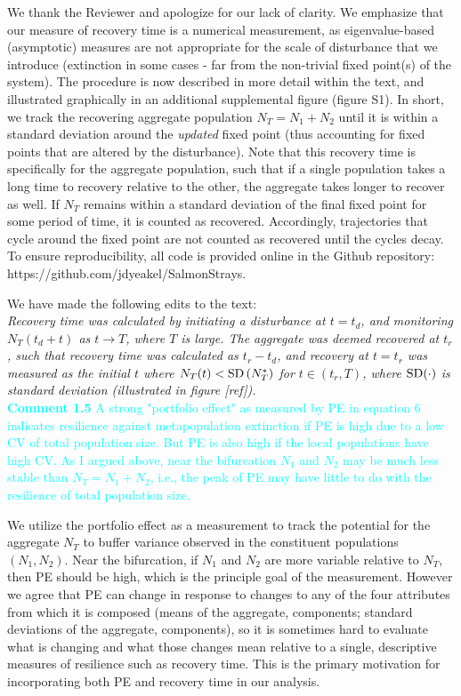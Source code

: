 \documentclass[ucm,12pt]{ucletter}
\begin{document}
\begin{letter}
 We thank the Reviewer and apologize for our lack of clarity. We emphasize that our measure of recovery time is a numerical measurement, as eigenvalue-based (asymptotic) measures are not appropriate for the scale of disturbance that we introduce (extinction in some cases - far from the non-trivial fixed point(s) of the system). The procedure is now described in more detail within the text, and illustrated graphically in an additional supplemental figure (figure S1). In short, we track the recovering aggregate population $N_T=N_1+N_2$ until it is within a standard deviation around the \emph{updated} fixed point (thus accounting for fixed points that are altered by the disturbance). Note that this recovery time is specifically for the aggregate population, such that if a single population takes a long time to recovery relative to the other, the aggregate takes longer to recover as well. If $N_T$ remains within a standard deviation of the final fixed point for some period of time, it is counted as recovered. Accordingly, trajectories that cycle around the fixed point are not counted as recovered until the cycles decay. To ensure reproducibility, all code is provided online in the Github repository: https://github.com/jdyeakel/SalmonStrays.

\noindent We have made the following edits to the text:\\
 \emph{Recovery time was calculated by initiating a disturbance at $t=t_d$, and monitoring $N_T(t_d+t)$ as $t\rightarrow T$, where $T$ is large. 
The aggregate was deemed recovered at $t_r$, such that recovery time was calculated as $t_r-t_d$, and recovery at $t=t_r$ was measured as the initial $t$ where $N_T(t) < {\rm SD}\left( N_T^* \right)$ for $t\in(t_r,T)$, where $\rm{SD}(\cdot)$ is standard deviation (illustrated in figure [ref]).}\\

\noindent \textcolor{cyan}{
{\bf Comment 1.5} A strong "portfolio effect" as measured by PE in equation 6 indicates resilience against metapopulation extinction if PE is high due to a low CV of total population size. But PE is also high if the local populations have high CV. As I argued above, near the bifurcation $N_1$ and $N_2$ may be much less stable than $N_T=N_1+N_2$, i.e., the peak of PE may have little to do with the resilience of total population size.
}

 We utilize the portfolio effect as a measurement to track the potential for the aggregate $N_T$ to buffer variance observed in the constituent populations $(N_1,N_2)$. Near the bifurcation, if $N_1$ and $N_2$ are more variable relative to $N_T$, then PE should be high, which is the principle goal of the measurement. 
However we agree that PE can change in response to changes to any of the four attributes from which it is composed (means of the aggregate, components; standard deviations of the aggregate, components), so it is sometimes hard to evaluate what is changing and what those changes mean relative to a single, descriptive measures of resilience such as recovery time. This is the primary motivation for incorporating both PE and recovery time in our analysis. 


\end{letter}
\end{document}
